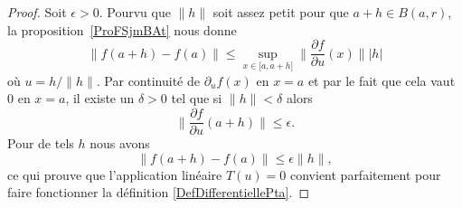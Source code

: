 \begin{proof}
    Soit \( \epsilon>0\). Pourvu que \( \| h \|\) soit assez petit pour que \( a+h\in B(a,r)\), la proposition~\ref{ProFSjmBAt} nous donne
    \begin{equation}
        \| f(a+h)-f(a) \|\leq \sup_{x\in\mathopen[ a , a+h \mathclose]}\| \frac{ \partial f }{ \partial u }(x) \|  |h |
    \end{equation}
    où \( u=h/\| h \|\). Par continuité de \( \partial_uf(x)\) en \( x=a\) et par le fait que cela vaut \( 0\) en \( x=a\), il existe un \( \delta>0\) tel que si \( \| h \|<\delta\) alors
    \begin{equation}
        \| \frac{ \partial f }{ \partial u }(a+h) \|\leq \epsilon.
    \end{equation}
    Pour de tels \( h\) nous avons
    \begin{equation}
        \| f(a+h)-f(a) \|\leq \epsilon\| h \|,
    \end{equation}
    ce qui prouve que l'application linéaire \( T(u)=0\) convient parfaitement pour faire fonctionner la définition \ref{DefDifferentiellePta}.
%

\end{proof}

